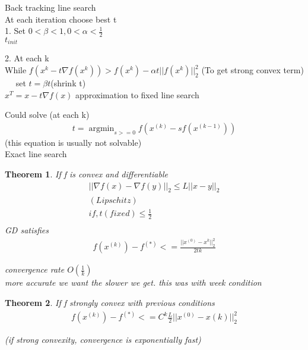 \documentclass[10pt]{article}
\newcounter{lecnum}
\newtheorem{theorem}{Theorem}[lecnum]
\DeclareMathOperator*{\argmin}{argmin}
\begin{document}
Back tracking line search \\
At each iteration choose best t \\
1. Set $0 <\beta < 1 , 0 < \alpha <\frac{1}{2}$\\
$t_{init}$

2. At each k \\
While $f(x^{k} - t\nabla f(x^{k})) > f(x^{k}) - \alpha t || f(x^{k}) ||^{2}_{2} $ (To get strong convex term) \\
	$\quad$ set $t = \beta t $(shrink t) \\
$x^{T} = x - t \nabla f(x)$
approximation to fixed line search

Could solve (at each k) \\
\begin{equation}
\begin{aligned}
t = \argmin_{s >= 0} f( x^{(k)} - s f(x^{(k-1)})) 
\end{aligned}
\end{equation}
(this equation is usually not solvable) \\
Exact line search


\begin{theorem}
If f is convex and differentiable
\begin{equation}
\begin{aligned}
	|| \nabla f(x) - \nabla f(y) ||_2 \leq L||x-y||_2  \\ (Lipschitz) \\
	if , t(fixed) \leq \frac{1}{2} \\
\end{aligned}
\end{equation}
GD satisfies \\
\begin{equation}
\begin{aligned}
	f(x^{(k)}) - f^{(*)}<= \frac{||x^{(0)} - x^k||^{2}_{2}}{2tk}
\end{aligned}
\end{equation}

convergence rate $ {O}(\frac{1}{k})$ \\

more accurate we want the slower we get.
this was with week condition
\end{theorem}

\begin{theorem}
If f strongly convex with previous conditions
\begin{equation}
\begin{aligned}
	f(x^{(k)}) - f^{(*)} <= C^{k}\frac{L}{2}||x^{(0)} - x{(k)}||_2^{2}
\end{aligned}
\end{equation}

(if strong convexity, convergence is exponentially fast)
\end{theorem}
\end{document}
